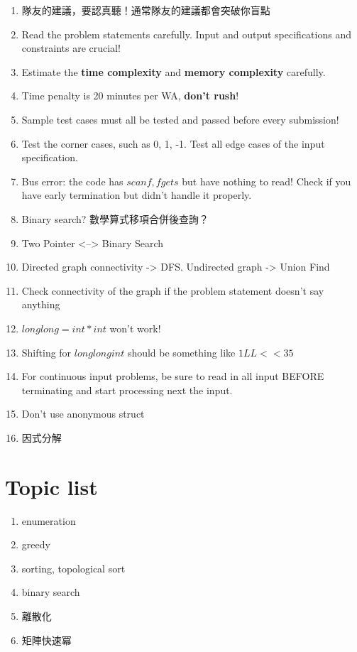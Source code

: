 \documentclass[10pt,oneside]{article}
\begin{document}
\begin{landscape}
\begin{multicols}{2}
\begin{enumerate}
	\item 隊友的建議，要認真聽！通常隊友的建議都會突破你盲點
	\item Read the problem statements carefully. Input and output specifications and constraints are crucial!
	\item Estimate the \textbf{time complexity} and \textbf{memory complexity} carefully.
	\item Time penalty is 20 minutes per WA, \textbf{don't rush}!
	\item Sample test cases must all be tested and passed before every submission!
	\item Test the corner cases, such as 0, 1, -1. Test all edge cases of the input specification.
	\item Bus error: the code has $scanf, fgets$ but have nothing to read! Check if you have early termination but didn't handle it properly.
	\item Binary search? 數學算式移項合併後查詢？
	\item Two Pointer <--> Binary Search
	\item Directed graph connectivity -> DFS. Undirected graph -> Union Find
	\item Check connectivity of the graph if the problem statement doesn't say anything
	\item $long long = int * int$ won't work!
	\item Shifting for $long long int$ should be something like $1LL << 35$
	\item For continuous input problems, be sure to read in all input BEFORE terminating and start processing next the input.
	\item Don't use anonymous struct
	\item 因式分解
\end{enumerate}

\section{Topic list}

\begin{enumerate}
	\item enumeration
	\item greedy
	\item sorting, topological sort
	\item binary search
	\item 離散化
	\item 矩陣快速冪
\end{enumerate}


\end{multicols}
\end{landscape}
\end{document}

